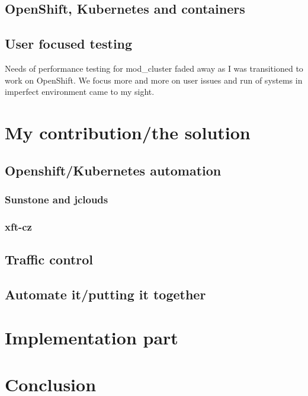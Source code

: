 \documentclass[
  master,
  biblatex,
  glossaries,
  index
]{kidiplom}
\begin{document}
\subsection{OpenShift, Kubernetes and containers}


\subsection{User focused testing}

Needs of performance testing for mod\_cluster faded away as I was transitioned to work on OpenShift. We focus more and more on user issues and run of systems in imperfect environment came to my sight.


\section{My contribution/the solution}

\subsection{Openshift/Kubernetes automation}


\subsubsection{Sunstone and jclouds}

\subsubsection{xft-cz}

\subsection{Traffic control}


\subsection{Automate it/putting it together}


\section{Implementation part}


\section{Conclusion}


\printbibliography
\end{document}
